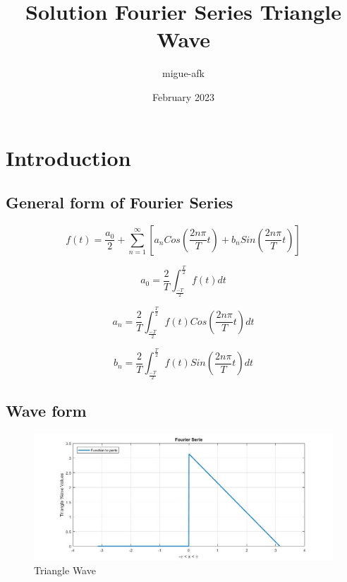 \documentclass{article}
\title{Solution Fourier Series Triangle Wave}
\author{migue-afk }
\date{February 2023}
\begin{document}
\maketitle

\section{Introduction}
\subsection{General form of Fourier Series}
\begin{equation}
    f(t)=\frac{a_0}{2}+\sum_{n=1}^{\infty} \left [a_n Cos \left ( \frac{2 n \pi}{T}t\right )  + b_n Sin \left ( \frac{2 n \pi}{T}t\right ) \right ]
\end{equation}

\begin{equation}
    a_0=\frac{2}{T} \int_{\frac{-T}{2}}^{\frac{T}{2}}f(t)dt
\end{equation}

\begin{equation}
    a_n=\frac{2}{T} \int_{\frac{-T}{2}}^{\frac{T}{2}}f(t)Cos \left ( \frac{2 n \pi}{T}t\right )dt
\end{equation}

\begin{equation}
    b_n=\frac{2}{T} \int_{\frac{-T}{2}}^{\frac{T}{2}}f(t)Sin \left ( \frac{2 n \pi}{T}t\right )dt
\end{equation}
\subsection{Wave form}


\begin{figure}[h]
    \begin{flushright}
        \centering
       \includegraphics[width=1\textwidth]{n2.jpg}
        \caption{Triangle Wave}
        \label{fig:n2}
    \end{flushright}
\end{figure}
\end{document}
